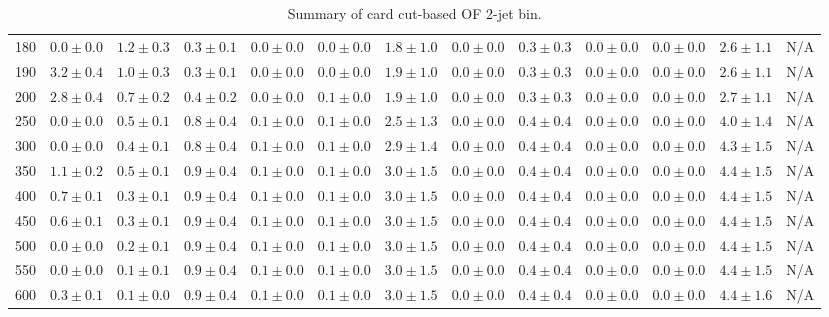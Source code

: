 \begin{table}
{\begin{center}
\begin{tabular}{l | c c | c c c c c c c c  | c c}
180 & $0.0\pm0.0$ & $1.2\pm0.3$ & $0.3\pm0.1$ & $0.0\pm0.0$ & $0.0\pm0.0$ & $1.8\pm1.0$ & $0.0\pm0.0$ & $0.3\pm0.3$ & $0.0\pm0.0$ & $0.0\pm0.0$ & $2.6\pm1.1$ & N/A \\
190 & $3.2\pm0.4$ & $1.0\pm0.3$ & $0.3\pm0.1$ & $0.0\pm0.0$ & $0.0\pm0.0$ & $1.9\pm1.0$ & $0.0\pm0.0$ & $0.3\pm0.3$ & $0.0\pm0.0$ & $0.0\pm0.0$ & $2.6\pm1.1$ & N/A \\
200 & $2.8\pm0.4$ & $0.7\pm0.2$ & $0.4\pm0.2$ & $0.0\pm0.0$ & $0.1\pm0.0$ & $1.9\pm1.0$ & $0.0\pm0.0$ & $0.3\pm0.3$ & $0.0\pm0.0$ & $0.0\pm0.0$ & $2.7\pm1.1$ & N/A \\
250 & $0.0\pm0.0$ & $0.5\pm0.1$ & $0.8\pm0.4$ & $0.1\pm0.0$ & $0.1\pm0.0$ & $2.5\pm1.3$ & $0.0\pm0.0$ & $0.4\pm0.4$ & $0.0\pm0.0$ & $0.0\pm0.0$ & $4.0\pm1.4$ & N/A \\
300 & $0.0\pm0.0$ & $0.4\pm0.1$ & $0.8\pm0.4$ & $0.1\pm0.0$ & $0.1\pm0.0$ & $2.9\pm1.4$ & $0.0\pm0.0$ & $0.4\pm0.4$ & $0.0\pm0.0$ & $0.0\pm0.0$ & $4.3\pm1.5$ & N/A \\
350 & $1.1\pm0.2$ & $0.5\pm0.1$ & $0.9\pm0.4$ & $0.1\pm0.0$ & $0.1\pm0.0$ & $3.0\pm1.5$ & $0.0\pm0.0$ & $0.4\pm0.4$ & $0.0\pm0.0$ & $0.0\pm0.0$ & $4.4\pm1.5$ & N/A \\
400 & $0.7\pm0.1$ & $0.3\pm0.1$ & $0.9\pm0.4$ & $0.1\pm0.0$ & $0.1\pm0.0$ & $3.0\pm1.5$ & $0.0\pm0.0$ & $0.4\pm0.4$ & $0.0\pm0.0$ & $0.0\pm0.0$ & $4.4\pm1.5$ & N/A \\
450 & $0.6\pm0.1$ & $0.3\pm0.1$ & $0.9\pm0.4$ & $0.1\pm0.0$ & $0.1\pm0.0$ & $3.0\pm1.5$ & $0.0\pm0.0$ & $0.4\pm0.4$ & $0.0\pm0.0$ & $0.0\pm0.0$ & $4.4\pm1.5$ & N/A \\
500 & $0.0\pm0.0$ & $0.2\pm0.1$ & $0.9\pm0.4$ & $0.1\pm0.0$ & $0.1\pm0.0$ & $3.0\pm1.5$ & $0.0\pm0.0$ & $0.4\pm0.4$ & $0.0\pm0.0$ & $0.0\pm0.0$ & $4.4\pm1.5$ & N/A \\
550 & $0.0\pm0.0$ & $0.1\pm0.1$ & $0.9\pm0.4$ & $0.1\pm0.0$ & $0.1\pm0.0$ & $3.0\pm1.5$ & $0.0\pm0.0$ & $0.4\pm0.4$ & $0.0\pm0.0$ & $0.0\pm0.0$ & $4.4\pm1.5$ & N/A \\
600 & $0.3\pm0.1$ & $0.1\pm0.0$ & $0.9\pm0.4$ & $0.1\pm0.0$ & $0.1\pm0.0$ & $3.0\pm1.5$ & $0.0\pm0.0$ & $0.4\pm0.4$ & $0.0\pm0.0$ & $0.0\pm0.0$ & $4.4\pm1.6$ & N/A \\
\hline
\end{tabular}
\end{center}
}
\caption{Summary of card cut-based OF 2-jet bin.}
\end{table}
